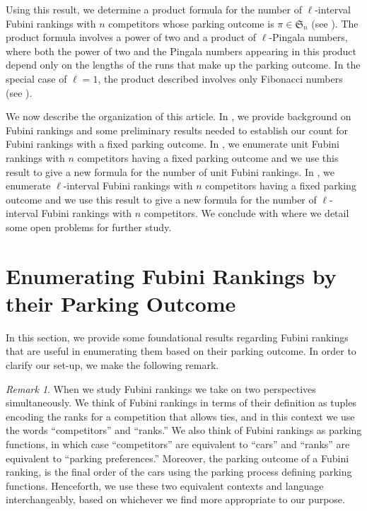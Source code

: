 \documentclass{amsart}
\theoremstyle{definition}
\theoremstyle{definition}
\theoremstyle{remark}
\newtheorem{remark}{Remark}[section]
\newcommand{\Sym}{\mathfrak{S}}
\begin{document}
Using this result, we determine a product formula for the number of $\ell$-interval Fubini rankings with $n$ competitors whose parking outcome is $\pi\in\Sym_n$ (see ). 
The product formula involves a power of two and a product of  $\ell$-Pingala numbers, where both the power of two and the Pingala numbers appearing in this product depend only on the lengths of the runs that make up the parking outcome.
In the special case of $\ell=1$, the product described involves only Fibonacci numbers (see ).

We now describe the organization of this article. In  , we provide background on Fubini rankings and some preliminary results needed to establish our count for Fubini rankings with a fixed parking outcome.
In , we enumerate unit Fubini rankings with $n$ competitors having a fixed parking outcome and we use this result to give a new formula for the number of unit Fubini rankings.
In , we enumerate 
$\ell$-interval 
Fubini rankings with $n$ competitors having a fixed parking outcome and we use this result to give a new formula for the number of $\ell$-interval Fubini rankings with $n$ competitors.
We conclude with  where we detail some open problems for further study.

\section{Enumerating Fubini Rankings by their Parking Outcome}\label{sec:FRs}
In this section, we provide some foundational results regarding Fubini rankings that are useful in enumerating them based on their parking outcome. 
In order to clarify our set-up, we make the following remark.
\begin{remark}
    When we study Fubini rankings we take on two perspectives simultaneously. 
    We think of Fubini rankings in terms of their definition as tuples encoding the ranks for a competition that allows ties, and in this context we use the words ``competitors'' and ``ranks.'' 
    We also think of Fubini rankings as parking functions, in which case ``competitors'' are equivalent to ``cars'' and ``ranks'' are equivalent to ``parking preferences.'' Moreover, the parking outcome of a Fubini ranking, is the final order of the cars using the parking process defining parking functions. 
    Henceforth, we use these two equivalent contexts and language interchangeably, based on whichever we find more appropriate to our purpose.
\end{remark}
\end{document}
